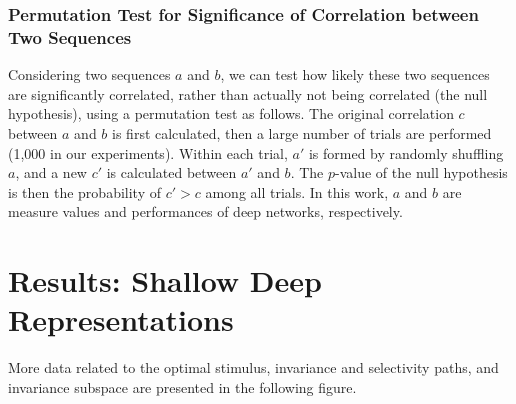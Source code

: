 \documentclass{article} %
\begin{document}
\subsubsection{Permutation Test for Significance of Correlation between Two Sequences}

Considering two sequences $a$ and $b$, we can test how likely these two sequences are significantly correlated, rather than actually not being correlated (the null hypothesis), using a permutation test as follows. The original correlation $c$ between $a$ and $b$ is first calculated, then a large number of trials are performed (1,000 in our experiments). Within each trial, $a'$ is formed by randomly shuffling $a$, and a new $c'$ is calculated between $a'$ and $b$. The $p$-value of the null hypothesis is then the probability of $c' > c$ among all trials.
In this work, $a$ and $b$ are measure values and performances of deep networks, respectively.



\clearpage

\section{Results: Shallow \vs Deep Representations}
\label{sec2}

More data related to the optimal stimulus, invariance and selectivity paths, and invariance subspace are presented in the following figure.
\end{document}
